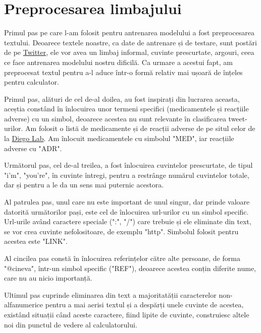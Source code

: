 \chapter{Preprocesarea limbajului}

Primul pas pe care l-am folosit pentru antrenarea modelului a fost preprocesarea textului.
Deoarece textele noastre, ca date de antrenare și de testare, sunt postări de pe \href{https://twitter.com/home}{Twitter},
ele vor avea un limbaj informal, cuvinte prescurtate, argouri, ceea ce face antrenarea modelului nostru
dificilă. Ca urmare a acestui fapt, am preprocesat textul pentru a-l aduce într-o formă relativ mai ușoară 
de înțeles pentru calculator.

Primul pas, alături de cel de-al doilea, au fost inspirați din lucrarea aceasta, aceștia constând în 
înlocuirea unor termeni specifici (medicamentele și reacțiile adverse) cu un simbol, deoarece acestea nu sunt
relevante în clasificarea tweet-urilor. Am folosit o listă
de medicamente și de reacții adverse de pe situl celor de la \href{http://diego.asu.edu/Publications/ADRClassify.html}{Diego Lab}.
Am înlocuit medicamentele cu simbolul "MED", iar reacțiile adverse cu "ADR".

Următorul pas, cel de-al treilea, a fost înlocuirea cuvintelor prescurtate, de tipul "i'm", "you're", în cuvinte întregi,
pentru a restrânge numărul cuvintelor totale, dar și pentru a le da un sens mai puternic acestora.

Al patrulea pas, unul care nu este important de unul singur, dar prinde valoare datorită următorilor pași, este
cel de înlocuirea url-urilor cu un simbol specific. Url-urile având caractere speciale (":", "/") care trebuie și 
ele eliminate din text, se vor crea cuvinte nefolositoare, de exemplu "http". Simbolul folosit pentru acestea este "LINK".

Al cincilea pas constă în înlocuirea referințelor către alte persoane, de forma "@cineva", într-un simbol specific ("REF"),
deoarece acestea conțin diferite nume, care nu au nicio importanță.

Ultimul pas cuprinde eliminarea din text a majoritatății caracterelor non-alfanumerice pentru a mai aerisi textul și a despărți unele cuvinte de acestea,
existând situații când aceste caractere, fiind lipite de cuvinte, construiesc altele noi din punctul de vedere al calculatorului.